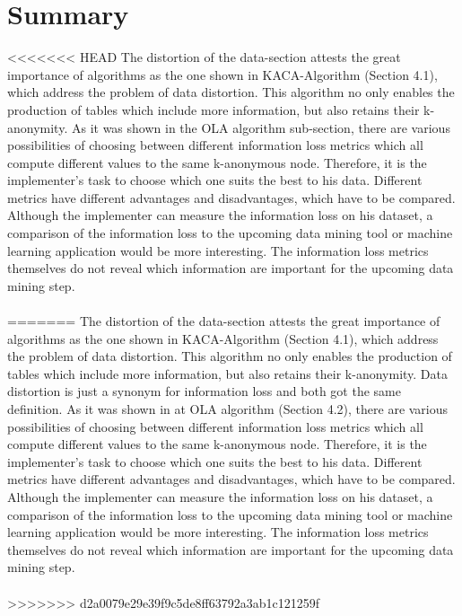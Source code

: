 \documentclass{llncs}
\begin{document}
\section{Summary}
<<<<<<< HEAD
The distortion of the data-section attests the great importance of algorithms as  the one shown in KACA-Algorithm (Section 4.1), which address the problem of data distortion. This algorithm no only enables the production of tables which include more information, but also retains their k-anonymity. As it was shown in the OLA algorithm sub-section, there are various possibilities of choosing between different information loss metrics which all compute different values to the same k-anonymous node. Therefore, it is the implementer’s task to choose which one suits the best to his data. Different metrics have different advantages and disadvantages, which have to be compared. Although the implementer can measure the information loss on his dataset, a comparison of the information loss to the upcoming data mining tool or machine learning application would be more interesting. The information loss metrics themselves do not reveal which information are important for the upcoming data mining step. \\\\
=======
The distortion of the data-section attests the great importance of algorithms as  the one shown in KACA-Algorithm (Section 4.1), which address the problem of data distortion. This algorithm no only enables the production of tables which include more information, but also retains their k-anonymity.  Data distortion is just a synonym for information loss and both got the same definition.
As it was shown in at OLA algorithm (Section 4.2), there are various possibilities of choosing between different information loss metrics which all compute different values to the same k-anonymous node. Therefore, it is the implementer’s task to choose which one suits the best to his data. Different metrics have different advantages and disadvantages, which have to be compared\cite{el2009globally}. Although the implementer can measure the information loss on his dataset, a comparison of the information loss to the upcoming data mining tool or machine learning application would be more interesting. The information loss metrics themselves do not reveal which information are important for the upcoming data mining step. \\\\
>>>>>>> d2a0079e29e39f9c5de8ff63792a3ab1c121259f
\end{document}
